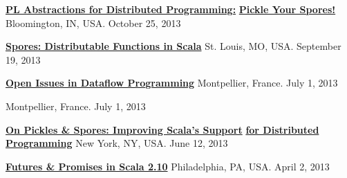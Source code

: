 \documentclass[9pt]{article}
\begin{document}
\noindent\href{http://heather.miller.am/files/IU-PL-Abstractions-for-Dist-Programming.pdf}{\bf PL Abstractions for Distributed Programming:} \vspace{-0.03in}
\linebreak\noindent\href{http://heather.miller.am/files/IU-PL-Abstractions-for-Dist-Programming.pdf}{\bf Pickle Your Spores!}\dates{}
\linebreak\noindent Bloomington, IN, USA. October 25, 2013
\bigskip

\noindent\href{https://speakerdeck.com/heathermiller/spores-distributable-functions-in-scala}{\bf Spores: Distributable Functions in Scala} 
\linebreak\noindent St. Louis, MO, USA. September 19, 2013
\bigskip

\noindent\href{http://heather.miller.am/files/LaME2013-Dataflow.pdf}{\bf Open Issues in Dataflow Programming} 
\linebreak\noindent Montpellier, France. July 1, 2013
\bigskip

 
\linebreak\noindent Montpellier, France. July 1, 2013
\bigskip

\noindent\href{https://speakerdeck.com/heathermiller/on-pickles-and-spores-improving-support-for-distributed-programming-in-scala}{\bf On Pickles \& Spores: Improving Scala's Support} \vspace{-0.03in}
\linebreak\noindent\href{https://speakerdeck.com/heathermiller/on-pickles-and-spores-improving-support-for-distributed-programming-in-scala}{\bf for Distributed Programming}\dates{}
\linebreak\noindent New York, NY, USA. June 12, 2013
\bigskip

\noindent\href{http://lampwww.epfl.ch/~hmiller/files/Futures-Try-PhillyETE.pdf}{\bf Futures \& Promises in Scala 2.10} 
\linebreak\noindent Philadelphia, PA, USA. April 2, 2013
\bigskip
\end{document}
